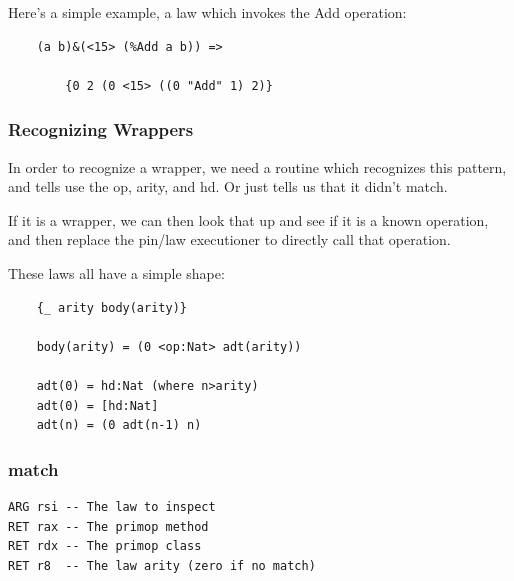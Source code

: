 Here's a simple example, a law which invokes the Add operation:

\begin{verbatim}
    (a b)&(<15> (%Add a b)) =>

        {0 2 (0 <15> ((0 "Add" 1) 2)}
\end{verbatim}


\subsubsection{Recognizing Wrappers}

In order to recognize a wrapper, we need a routine which recognizes this
pattern, and tells use the op, arity, and hd.  Or just tells us that it
didn't match.

If it is a wrapper, we can then look that up and see if it is a known
operation, and then replace the pin/law executioner to directly call
that operation.

These laws all have a simple shape:

\begin{verbatim}
    {_ arity body(arity)}

    body(arity) = (0 <op:Nat> adt(arity))

    adt(0) = hd:Nat (where n>arity)
    adt(0) = [hd:Nat]
    adt(n) = (0 adt(n-1) n)
\end{verbatim}

\subsubsection{match}

\begin{verbatim}
ARG rsi -- The law to inspect
RET rax -- The primop method
RET rdx -- The primop class
RET r8  -- The law arity (zero if no match)
\end{verbatim}

